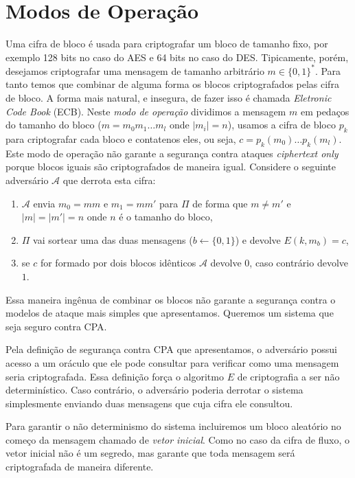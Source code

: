 \section{Modos de Operação}
\label{sec:modos-de-operacao-bloco}

Uma cifra de bloco é usada para criptografar um bloco de tamanho fixo, por exemplo 128 bits no caso do AES e 64 bits no caso do DES.
Tipicamente, porém, desejamos criptografar uma mensagem de tamanho arbitrário $m \in \{0,1\}^*$.
Para tanto temos que combinar de alguma forma os blocos criptografados pelas cifra de bloco.
A forma mais natural, e insegura, de fazer isso é chamada {\em Eletronic Code Book} (ECB).
Neste {\em modo de operação} dividimos a mensagem $m$ em pedaços do tamanho do bloco ($m = m_0 m_1 \dots m_l$ onde $|m_i| = n$), usamos a cifra de bloco $p_k$ para criptografar cada bloco e contatenos eles, ou seja, $c = p_k(m_0) \dots p_k(m_l)$.
Este modo de operação não garante a segurança contra ataques {\em ciphertext only} porque blocos iguais são criptografados de maneira igual.
Considere o seguinte adversário $\mathcal{A}$ que derrota esta cifra:
\begin{enumerate}
\item $\mathcal{A}$ envia $m_0 = mm$ e $m_1=mm'$ para $\Pi$ de forma que $m \neq m'$ e $|m| = |m'| = n$ onde $n$ é o tamanho do bloco,
\item $\Pi$ vai sortear uma das duas mensagens ($b \leftarrow \{0,1\}$) e devolve $E(k, m_b) =c$,
\item se $c$ for formado por dois blocos idênticos $\mathcal{A}$ devolve $0$, caso contrário devolve $1$.
\end{enumerate}


Essa maneira ingênua de combinar os blocos não garante a segurança contra o modelos de ataque mais simples que apresentamos.
Queremos um sistema que seja seguro contra CPA.

Pela definição de segurança contra CPA que apresentamos, o adversário possui acesso a um oráculo que ele pode consultar para verificar como uma mensagem seria criptografada.
Essa definição força o algoritmo $E$ de criptografia a ser não determinístico.
Caso contrário, o adversário poderia derrotar o sistema simplesmente enviando duas mensagens que cuja cifra ele consultou.

Para garantir o não determinismo do sistema incluiremos um bloco aleatório no começo da mensagem chamado de {\em vetor inicial}.
Como no caso da cifra de fluxo, o vetor inicial não é um segredo, mas garante que toda mensagem será criptografada de maneira diferente.

